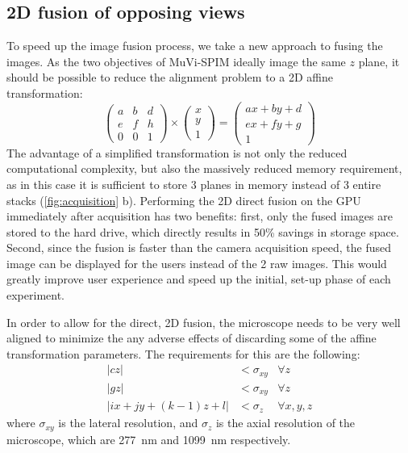 \subsection{2D fusion of opposing views}
To speed up the image fusion process, we take a new approach to fusing the images. As the two objectives of MuVi-SPIM ideally image the same $z$ plane, it should be possible to reduce the alignment problem to a 2D affine transformation:
\[
\begin{pmatrix}
a & b & d\\ 
e & f & h \\
0 & 0 & 1
\end{pmatrix}
\times
\begin{pmatrix}
x\\
y\\
1
\end{pmatrix}
=
\begin{pmatrix}
a x + b y + d\\ 
e x + f y + g\\
1
\end{pmatrix}
\]
The advantage of a simplified transformation is not only the reduced computational complexity, but also the massively reduced memory requirement, as in this case it is sufficient to store 3 planes in memory instead of 3 entire stacks (\autoref{fig:acquisition} b). Performing the 2D direct fusion on the GPU immediately after acquisition has two benefits: first, only the fused images are stored to the hard drive, which directly results in 50\% savings in storage space. Second, since the fusion is faster than the camera acquisition speed, the fused image can be displayed for the users instead of the 2 raw images. This would greatly improve user experience and speed up the initial, set-up phase of each experiment.

In order to allow for the direct, 2D fusion, the microscope needs to be very well aligned to minimize the any adverse effects of discarding some of the affine transformation parameters. The requirements for this are the following:
\begin{align}
\left| c z \right| &< \sigma_{xy} & \forall z \label{eq:req1}\\
\left| g z \right|  &< \sigma_{xy} & \forall z \label{eq:req2}\\
\left| i x + j y + (k-1)  z + l \right| &< \sigma_z & \forall x, y, z  \label{eq:req3}
\end{align}
where $\sigma_{xy}$ is the lateral resolution, and $\sigma_z$ is the axial resolution of the microscope, which are \SI{277}{nm} and \SI{1099}{nm} respectively. 

